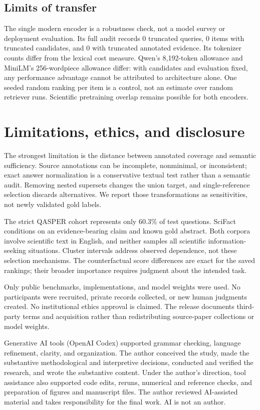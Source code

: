 \documentclass[twoside,a4paper,11pt]{article}
\begin{document}
\subsection{Limits of transfer}
The single modern encoder is a robustness check, not a model survey or deployment evaluation. Its full audit records 0 truncated queries, 0 items with truncated candidates, and 0 with truncated annotated evidence. Its tokenizer counts differ from the lexical cost measure. Qwen's 8,192-token allowance and MiniLM's 256-wordpiece allowance differ: with candidates and evaluation fixed, any performance advantage cannot be attributed to architecture alone. One seeded random ranking per item is a control, not an estimate over random retriever runs. Scientific pretraining overlap remains possible for both encoders.


\section{Limitations, ethics, and disclosure}
The strongest limitation is the distance between annotated coverage and semantic sufficiency. Source annotations can be incomplete, nonminimal, or inconsistent; exact answer normalization is a conservative textual test rather than a semantic audit. Removing nested supersets changes the union target, and single-reference selection discards alternatives. We report those transformations as sensitivities, not newly validated gold labels.

The strict QASPER cohort represents only 60.3\% of test questions. SciFact conditions on an evidence-bearing claim and known gold abstract. Both corpora involve scientific text in English, and neither samples all scientific information-seeking situations. Cluster intervals address observed dependence, not these selection mechanisms. The counterfactual score differences are exact for the saved rankings; their broader importance requires judgment about the intended task.

Only public benchmarks, implementations, and model weights were used. No participants were recruited, private records collected, or new human judgments created. No institutional ethics approval is claimed. The release documents third-party terms and acquisition rather than redistributing source-paper collections or model weights.

Generative AI tools (OpenAI Codex) supported grammar checking, language refinement, clarity, and organization. The author conceived the study, made the substantive methodological and interpretive decisions, conducted and verified the research, and wrote the substantive content. Under the author's direction, tool assistance also supported code edits, reruns, numerical and reference checks, and preparation of figures and manuscript files. The author reviewed AI-assisted material and takes responsibility for the final work. AI is not an author.
\end{document}
